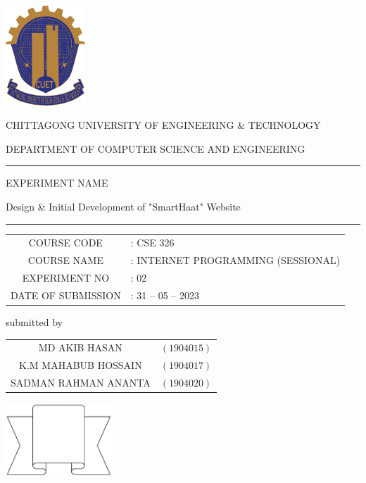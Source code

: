 \documentclass[a4paper,12pt]{report}
\begin{document}
\begin{titlepage}

	\centering

	\includegraphics[width=3cm, keepaspectratio]{cuet.png} \par \vspace{0.5cm}
	\begin{Large}
		CHITTAGONG UNIVERSITY OF ENGINEERING \& TECHNOLOGY
	\end{Large}
	\par
	\vspace{.5cm}
	{DEPARTMENT OF COMPUTER SCIENCE AND ENGINEERING}
\vspace{1cm}

	\raisebox{-\baselineskip}{\rule{\textwidth}{1px}}
	\rule{\textwidth}{1px}
{\Large{{EXPERIMENT NAME}}}\par \vspace{0.5cm}
\huge{{Design \& Initial Development of "SmartHaat" Website}}
	\rule{\textwidth}{2px}

\vspace{0.5cm}

	\normalsize
\begin{tabular}{cl}
	COURSE CODE        & : CSE 326                          \\
	COURSE NAME        & : INTERNET PROGRAMMING (SESSIONAL) \\
	EXPERIMENT NO      & : 02                               \\
	DATE OF SUBMISSION & : 31 -- 05 -- 2023
\end{tabular}
\vspace{0.5cm}

	\parbox[l]{9cm}{
		\begin{center}
			submitted by
		\end{center}

		\begin{tabular}{cl}
			MD AKIB HASAN        & $(1904015)$ \\
			K.M MAHABUB HOSSAIN  & $(1904017)$ \\
			SADMAN RAHMAN ANANTA & $(1904020)$ \\
		\end{tabular}
	}
	\parbox[r]{7cm}{
		\vspace{1cm}
		\begin{center}
			\includegraphics[width=4cm, keepaspectratio]{remarks.png}
		\end{center}
	}


\end{titlepage}
\end{document}
